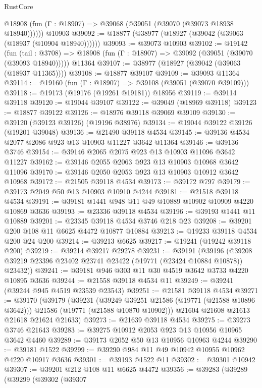 \begin{lexlean}{RustCore}
\begin{coremodule}
      @18908 (fun (Γ : @18907) => @39068 (@39051 (@39070 (@39073 @18938 @18940))))))
    @10903
@39092 := @18877 (@38977 (@18927 (@39042 (@39063 (@18937 (@10904 @18940))))))
@39093 := @39073 @10903
@39102 := @19142
    (fun (tail : @3708) => @18908 (fun (Γ : @18907) => @39092 (@39051 (@39070 (@39093 @18940)))))
    @11364
@39107 := @38977 (@18927 (@39042 (@39063 (@18937 @11365))))
@39108 := @18877 @39107
@39109 := @39093 @11364
@39114 := @19160 (fun (Γ : @18907) => @39108 (@39051 (@39070 @39109)))
@39118 := @19173 (@19176 (@19261 @19181)) @18956
@39119 := @39114 @39118
@39120 := @19044 @39107
@39122 := @39049 (@18969 @39118)
@39123 := @18877 @39122
@39126 := @18976 @39118 @39069 @39109
@39130 := @39120 (@39123 @39126) (@19196 @38976)
@39134 := @19044 @39122 @39126 (@19201 @39048)
@39136 := @21490 @39118 @4534
@39145 := @39136 @4534 @2077 @2086 @923 @13 @10903 @11227 @3642 @11364
@39146 := @39136 @3746
@39154 := @39146 @2065 @2075 @923 @13 @10903 @11096 @3642 @11227
@39162 := @39146 @2055 @2063 @923 @13 @10903 @10968 @3642 @11096
@39170 := @39146 @2050 @2053 @923 @13 @10903 @10912 @3642 @10968
@39172 := @21505 @39118 @4534
@39173 := @39172 @797
@39179 := @39173 @2049 @50 @13 @10903 @10910 @4244
@39181 := @21518 @39118 @4534
@39191 := @39181 @1441 @948 @11 @49 @10889 @10902 @10909 @4220 @10869 @3636
@39193 := @23336 @39118 @4534
@39196 := @39193 @1441 @11 @10889
@39201 := @23345 @39118 @4534 @3746 @218 @23
@39208 := @39201 @200 @108 @11 @6625 @4472 @10877 @10884
@39213 := @19233 @39118 @4534 @200 @24 @200
@39214 := @39213 @6625
@39217 := @19241 (@19242 @39118 @200)
@39219 := @39214 @39217 @29278
@39231 := @39191
    (@39196 (@39208 @39219 @23396 @23402 @23741 @23422 (@19771 (@23424 @10884 @10878)) @23432))
@39241 := @39181 @946 @303 @11 @30 @4519 @3642 @3733 @4220 @10895 @3636
@39244 := @21558 @39118 @4534 @11
@39249 := @39241 (@39244 @945 @4519 @23539 @23543)
@39251 := @21581 @39118 @4534
@39271 := @39170
    (@39179
      (@39231
        (@39249 @39251 @21586 (@19771 (@21588 @10896 @3642)))
        @21586
        (@19771 (@21588 @10870 @10902)))
      @21604
      @21608
      @21613
      @21618
      @21624
      @21633)
@39273 := @21639 @39118 @4534
@39275 := @39273 @3746 @21643
@39283 := @39275 @10912 @2053 @923 @13 @10956 @10965 @3642 @4460
@39289 := @39173 @2052 @50 @13 @10956 @10963 @4244
@39290 := @39181 @1522
@39299 := @39290 @984 @11 @49 @10942 @10955 @10962 @4220 @10917 @3636
@39301 := @39193 @1522 @11
@39302 := @39301 @10942
@39307 := @39201 @212 @108 @11 @6625 @4472
@39356 := @39283
    (@39289
      (@39299
        (@39302
          (@39307

\end{coremodule}
\end{lexlean}
